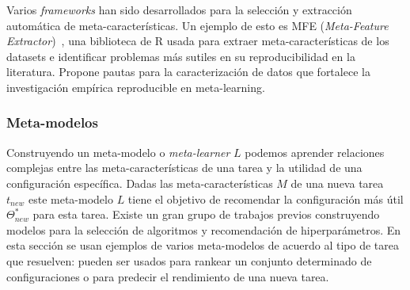 Varios \textit{frameworks} han sido desarrollados para la selección y extracción automática de meta-características. Un ejemplo de esto es MFE (\textit{Meta-Feature Extractor})~\cite{Rivolli2018TowardsRE}, una biblioteca de R usada para extraer meta-características de los datasets e identificar problemas más sutiles en su reproducibilidad en la literatura. Propone pautas para la caracterización de datos que fortalece la investigación empírica reproducible en meta-learning.


%

\subsubsection{Meta-modelos}


Construyendo un meta-modelo o \textit{meta-learner} $L$ podemos aprender relaciones complejas entre las meta-características de una tarea y la utilidad de una configuración específica. Dadas las meta-características $M$ de una nueva tarea $t_{new}$ este meta-modelo $L$ tiene el objetivo de recomendar la configuración más útil $\Theta_{new}^*$ para esta tarea. Existe un gran grupo de trabajos previos construyendo modelos para la selección de algoritmos y recomendación de hiperparámetros. En esta sección se usan ejemplos de varios meta-modelos de acuerdo al tipo de tarea que resuelven: pueden ser usados para rankear un conjunto determinado de configuraciones o para predecir el rendimiento de una nueva tarea. %


